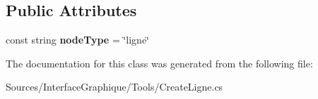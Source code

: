 \subsection*{Public Attributes}
\begin{DoxyCompactItemize}
\item 
\hypertarget{class_interface_graphique_1_1_tools_1_1_create_ligne_abe729b1a7fadece9f5b3f81dff5f994b}{}const string {\bfseries node\+Type} = \char`\"{}ligne\char`\"{}\label{class_interface_graphique_1_1_tools_1_1_create_ligne_abe729b1a7fadece9f5b3f81dff5f994b}

\end{DoxyCompactItemize}


The documentation for this class was generated from the following file\+:\begin{DoxyCompactItemize}
\item 
Sources/\+Interface\+Graphique/\+Tools/Create\+Ligne.\+cs\end{DoxyCompactItemize}
